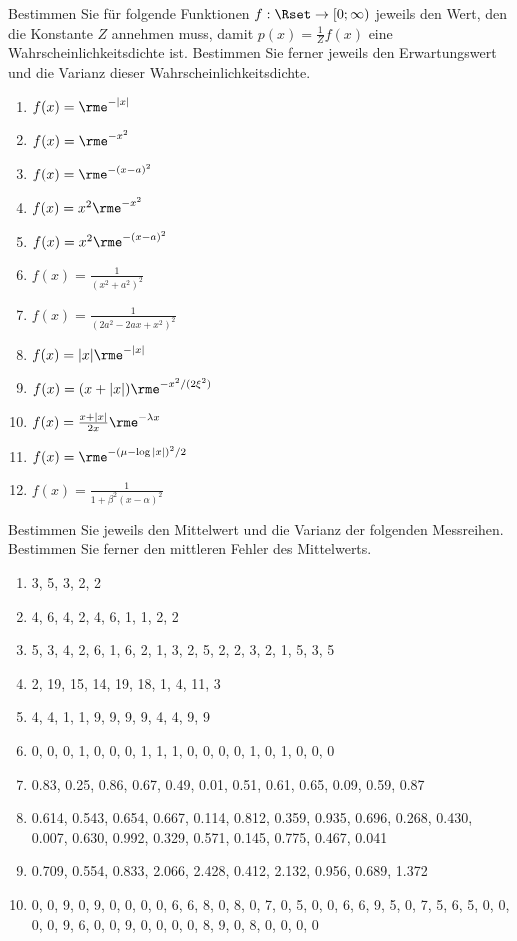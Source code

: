 
Bestimmen Sie für folgende Funktionen $f:\Rset\to[0;\infty)$ jeweils
den Wert, den die Konstante $Z$ annehmen muss, damit
$p(x)=\frac{1}{Z}f(x)$ eine Wahrscheinlichkeitsdichte ist.
Bestimmen Sie ferner jeweils den Erwartungswert und die Varianz dieser
Wahrscheinlichkeitsdichte.\\
\parbox{0.5\textwidth}{\begin{enumerate}
\item $f(x)=\rme^{-|x|}$
\item $f(x)=\rme^{-x^2}$
\item $f(x)=\rme^{-(x-a)^2}$
\item $f(x)=x^2\rme^{-x^2}$
\item $f(x)=x^2\rme^{-(x-a)^2}$
\item $f(x)=\frac{1}{\left(x^2+a^2\right)^2}$
\end{enumerate}}\parbox{0.5\textwidth}{\begin{enumerate}\setcounter{enumi}{6}
\item $f(x)=\frac{1}{\left(2 a^2-2 a x+x^2\right)^2}$
\item $f(x)=|x|\rme^{-|x|}$
\item $f(x)=(x+|x|)\rme^{-x^2/(2\xi^2)}$
\item $f(x)=\frac{x+|x|}{2x}\rme^{-\lambda x}$
\item $f(x)=\rme^{-(\mu-\log |x|)^2/2}$
\item $f(x)=\frac{1}{1+\beta^2(x-\alpha)^2}$
\end{enumerate}}




Bestimmen Sie jeweils den Mittelwert und die Varianz der folgenden Messreihen.
Bestimmen Sie ferner den mittleren Fehler des Mittelwerts.
\begin{enumerate}
\item {3, 5, 3, 2, 2}
\item {4, 6, 4, 2, 4, 6, 1, 1, 2, 2}
\item {5, 3, 4, 2, 6, 1, 6, 2, 1, 3, 2, 5, 2, 2, 3, 2, 1, 5, 3, 5}
\item {2, 19, 15, 14, 19, 18, 1, 4, 11, 3}
\item {4, 4, 1, 1, 9, 9, 9, 9, 4, 4, 9, 9}
\item {0, 0, 0, 1, 0, 0, 0, 1, 1, 1, 0, 0, 0, 0, 1, 0, 1, 0, 0, 0}
\item {0.83, 0.25, 0.86, 0.67, 0.49, 0.01, 0.51, 0.61, 0.65, 0.09, 0.59, 0.87}
\item {0.614, 0.543, 0.654, 0.667, 0.114, 0.812, 
        0.359, 0.935, 0.696, 0.268, 0.430, 0.007, 0.630, 
        0.992, 0.329, 0.571, 0.145, 0.775, 0.467, 0.041}
\item {0.709, 0.554, 0.833, 2.066, 2.428, 0.412, 2.132, 0.956, 0.689, 1.372}
\item {0, 0, 9, 0, 9, 0, 0, 0, 0, 6, 6, 8, 0, 8, 0, 7, 0, 5, 0, 0, 6, 6, 9,
5, 0, 7, 5, 6, 5, 0, 0, 0, 0, 9, 6, 0, 0, 9, 0, 0, 0, 0, 8, 9, 0, 8,
0, 0, 0, 0} 
\end{enumerate}


